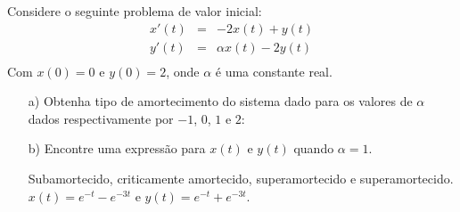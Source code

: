 \begin{exer}
Considere o seguinte problema de valor inicial:
\begin{eqnarray*}
x'(t)&=&-2x(t) +  y(t)\\
y'(t)&=&\alpha x(t) - 2y(t)\\
\end{eqnarray*}
Com $x(0)=0$ e $y(0)=2$, onde $\alpha$ é uma constante real.
\begin{itemize}
 \item[a)] Obtenha tipo de amortecimento do sistema dado para os valores de $\alpha$ dados respectivamente por $-1$, $0$, $1$ e $2$:
 \item [b)] Encontre uma expressão para $x(t)$ e $y(t)$ quando $\alpha=1$. 
 
 Subamortecido, criticamente amortecido, superamortecido e superamortecido. $x(t)=e^{-t}-e^{-3t}$ e $y(t)=e^{-t}+e^{-3t}$.
\end{itemize}

\end{exer}
